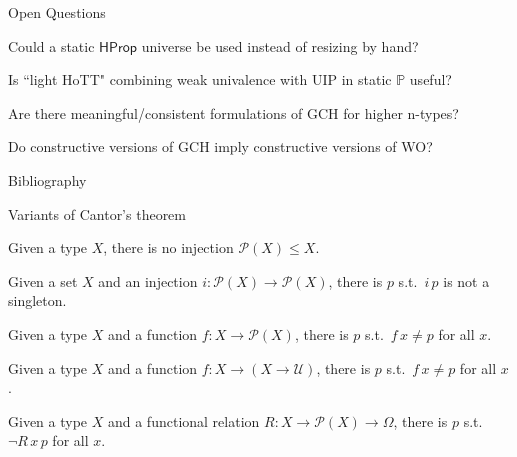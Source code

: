 \documentclass[xcolor=dvipsnames,compress,aspectratio=169,handout]{beamer}
\newcommand{\MBB}[1]{\ensuremath{\mathbb{#1}}\xspace}  %
\newcommand{\MCL}[1]{\ensuremath{\mathcal{#1}}\xspace} %
\newcommand{\Pow}{\MCL P}
\newcommand{\Prop}{\MBB P}
\begin{document}
\begin{frame}{Open Questions}
	\begin{centering}
		\begin{widerbox}
		\center
		Could a static $\mathsf{HProp}$ universe be used instead of resizing by hand?
		\end{widerbox}
		\pause
		\vspace{0.3cm}
		\begin{widerbox}
		\center
		Is ``light HoTT" combining weak univalence with UIP in static $\Prop$ useful?
		\end{widerbox}
		\pause
		\vspace{0.3cm}
		\begin{widerbox}
		\center
		Are there meaningful/consistent formulations of GCH for higher n-types?
		\end{widerbox}
		\pause
		\vspace{0.3cm}
		\begin{widerbox}
		\center
		Do constructive versions of GCH imply constructive versions of WO?
		\end{widerbox}
	\end{centering}
\end{frame}



\begin{frame}{Bibliography}
\footnotesize


\end{frame}

\begin{frame}{Variants of Cantor's theorem}
\begin{fact}
	Given a type $X$, there is no injection $\Pow(X)\le X$.
\end{fact}
\vspace{-0.1cm}
\begin{fact}
	Given a set $X$ and an injection $i:\Pow(X)\to\Pow(X)$, there is $p$ s.t.\ $i\,p$ is not a singleton.
\end{fact}
\vspace{-0.1cm}
\begin{fact}
	Given a type $X$ and a function $f:X\to \Pow(X)$, there is $p$ s.t.\ $f\,x\not = p$ for all $x$.
\end{fact}
\vspace{-0.1cm}
\begin{fact}
	Given a type $X$ and a function $f:X\to (X \to \mathcal U)$, there is $p$ s.t.\ $f\,x\not = p$ for all $x$.
\end{fact}
\vspace{-0.1cm}
\begin{fact}
	Given a type $X$ and a functional relation $R:X\to \Pow(X)\to\Omega$, there is $p$ s.t.\ $\neg R\,x\,p$ for all $x$.
\end{fact}
\end{frame}
\end{document}
